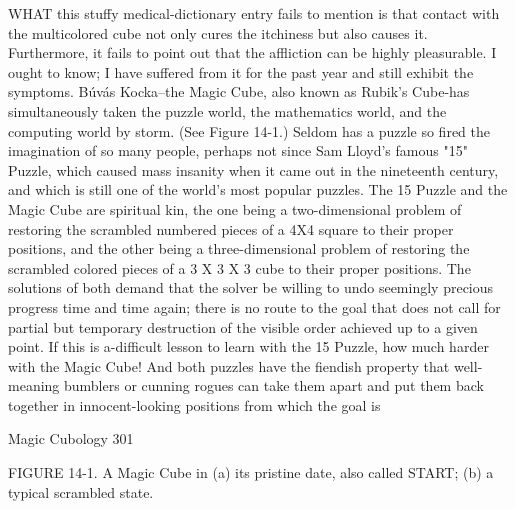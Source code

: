 WHAT this stuffy medical-dictionary entry fails to mention is that contact with
the multicolored cube not only cures the itchiness but also causes it. Furthermore, it
fails to point out that the affliction can be highly pleasurable. I ought to know; I have
suffered from it for the past year and still exhibit the symptoms.
         Búvás Kocka--the Magic Cube, also known as Rubik's Cube-has
simultaneously taken the puzzle world, the mathematics world, and the computing
world by storm. (See Figure 14-1.) Seldom has a puzzle so fired the imagination of so
many people, perhaps not since Sam Lloyd’s famous "15" Puzzle, which caused mass
insanity when it came out in the nineteenth century, and which is still one of the
world's most popular puzzles. The 15 Puzzle and the Magic Cube are spiritual kin, the
one being a two-dimensional problem of restoring the scrambled numbered pieces of
a 4X4 square to their proper positions, and the other being a three-dimensional
problem of restoring the scrambled colored pieces of a 3 X 3 X 3 cube to their proper
positions. The solutions of both demand that the solver be willing to undo seemingly
precious progress time and time again; there is no route to the goal that does not call
for partial but temporary destruction of the visible order achieved up to a given point.
If this is a-difficult lesson to learn with the 15 Puzzle, how much harder with the
Magic Cube! And both puzzles have the fiendish property that well-meaning
bumblers or cunning rogues can take them apart and put them back together in
innocent-looking positions from which the goal is




Magic Cubology                                                                       301

FIGURE 14-1. A Magic Cube in (a) its pristine date, also called START; (b) a typical
scrambled state.


